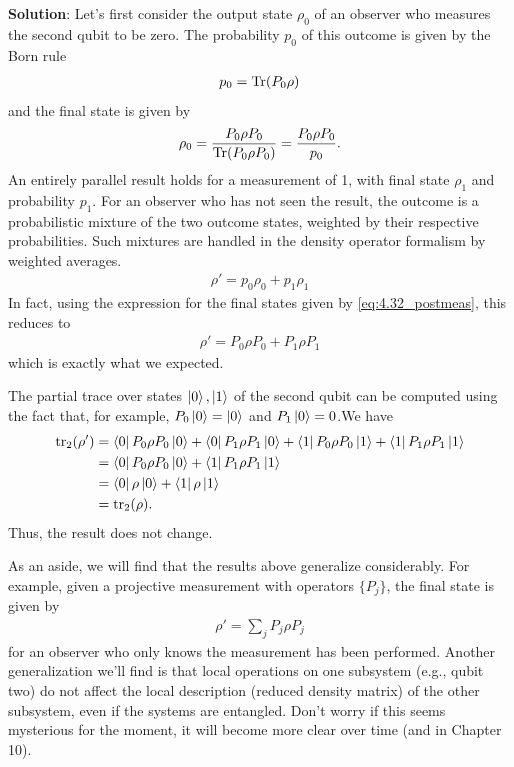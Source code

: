 \documentclass{book}
\begin{document}
    \textbf{Solution}: Let's first consider the output state $\rho_0$ of an observer who measures the second qubit to be zero. The probability $p_0$ of this outcome is given by the Born rule
    \begin{align}
        p_0 = \Tr(P_0 \rho)
    \end{align}
    and the final state is given by
    \begin{align} \label{eq:4.32_postmeas}
        \rho_0 = \frac{P_0 \rho P_0}{\Tr(P_0 \rho P_0)} = \frac{P_0 \rho P_0}{p_0}.
    \end{align}
    An entirely parallel result holds for a measurement of 1, with final state $\rho_1$ and probability $p_1$. For an observer who has not seen the result, the outcome is a probabilistic mixture of the two outcome states, weighted by their respective probabilities. Such mixtures are handled in the density operator formalism by weighted averages.
    \begin{align}
        \rho' = p_0 \rho_0 + p_1 \rho_1
    \end{align}
    In fact, using the expression for the final states given by \eqref{eq:4.32_postmeas}, this reduces to 
    \begin{align}
        \rho' = P_0 \rho P_0 + P_1 \rho P_1
    \end{align}
    which is exactly what we expected. 

    The partial trace over states $\ket{0}, \ket{1}$ of the second qubit can be computed using the fact that, for example, $P_0 \ket{0} = \ket{0}$ and $P_1 \ket{0} = 0$.We have
    \begin{align}
    \begin{aligned}
        \tr_2(\rho') &= \bra{0}P_0 \rho P_0 \ket{0} + \bra{0}P_1 \rho P_1 \ket{0} + \bra{1}P_0 \rho P_0 \ket{1} + \bra{1}P_1 \rho P_1 \ket{1} \\
        &= \bra{0}P_0 \rho P_0 \ket{0} + \bra{1}P_1 \rho P_1 \ket{1} \\
        &= \bra{0}\rho\ket{0} + \bra{1}\rho\ket{1} \\
        &=\tr_2(\rho).
    \end{aligned}
    \end{align}
    Thus, the result does not change. 

    As an aside, we will find that the results above generalize considerably. For example, given a projective measurement with operators $\{P_j\}$, the final state is given by 
    \begin{align}
        \rho' = \sum_j P_j \rho P_j
    \end{align}
    for an observer who only knows the measurement has been performed. Another generalization we'll find is that local operations on one subsystem (e.g., qubit two) do not affect the local description (reduced density matrix) of the other subsystem, even if the systems are entangled. Don't worry if this seems mysterious for the moment, it will become more clear over time (and in Chapter 10).
\end{document}
